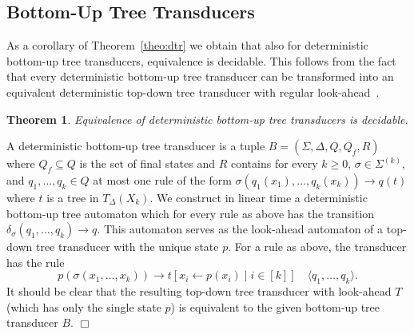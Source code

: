 \documentclass[copyright,creativecommons]{eptcs}
\newtheorem{theorem}{Theorem}
\newcommand{\eop}{\hspace*{\fill}$\Box$}
\newenvironment{proof}{{\it Proof.}\quad}{\eop\vspace*{4mm}}
\begin{document}
\subsection{Bottom-Up Tree Transducers}

As a corollary of Theorem~\ref{theo:dtr} we obtain that
also for deterministic bottom-up tree transducers,
equivalence is decidable.
This follows from the fact that every deterministic bottom-up tree transducer
can be transformed into an equivalent deterministic top-down tree transducer
with regular look-ahead~\cite{DBLP:journals/mst/Engelfriet77}.

\begin{theorem}\rm\label{theo:bu}
Equivalence of deterministic bottom-up tree transducers is decidable.
\end{theorem}
\begin{proof}
A deterministic bottom-up tree transducer is a 
tuple $B=(\Sigma,\Delta,Q,Q_f,R)$
where $Q_f\subseteq Q$ is the set of final states and $R$ contains
for every $k\geq 0$, $\sigma\in\Sigma^{(k)}$, and $q_1,\dots,q_k\in Q$
at most one rule of the form 
$\sigma(q_1(x_1),\dots,q_k(x_k))\to q(t)$ where
$t$ is a tree in $T_\Delta(X_k)$.
We construct in linear time a deterministic bottom-up 
tree automaton which for every rule
as above has the transition $\delta_\sigma(q_1,\dots,q_k)\to q$.
This automaton serves as the look-ahead automaton of a top-down
tree transducer with the unique state $p$.
For a rule as above, the transducer has the rule
\[
p(\sigma(x_1,\dots,x_k))\to t[x_i\leftarrow p(x_i)\mid i\in[k]]\quad\langle q_1,\dots,q_k\rangle.
\]
It should be clear that the resulting top-down tree transducer 
with look-ahead $T$ (which has only the single state $p$)
is equivalent to the given bottom-up tree transducer $B$.
\end{proof}
\end{document}
